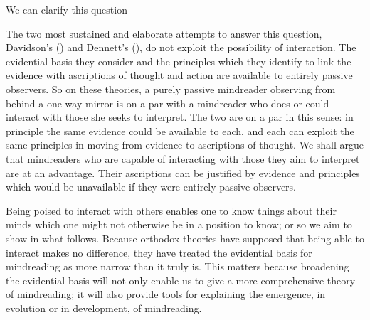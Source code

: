 \documentclass[12pt,a4paper]{extarticle}
\begin{document}
We can clarify this question



The two most sustained and elaborate attempts to answer this question,
Davidson's (\citeyear{Davidson:1984wh}) and Dennett's (\citeyear{Dennett:1987sf}),
do not exploit the possibility of interaction.
The evidential basis they consider and the principles which they identify to link the evidence with ascriptions of thought and action are available to entirely passive observers.
So on these theories,
a purely passive mindreader observing from behind a one-way mirror
is on a par with
a mindreader who does or could interact with those she seeks to interpret.
The two are on a par in this sense:
in principle the same evidence could be available to each, and each can exploit the same principles in moving from evidence to ascriptions of thought.
We shall argue that mindreaders who are capable of interacting with those they aim to interpret are at an advantage.
Their ascriptions can be justified by evidence and principles which would be unavailable if they were entirely passive observers.

Being poised to interact with others enables one to know things about their minds which one might not otherwise be in a position to know; or so we aim to show in what follows.
Because orthodox theories have supposed that being able to interact makes no difference,
they have treated the evidential basis for mindreading as more narrow than it truly is.
This matters because broadening the evidential basis will not only enable us to give a more comprehensive theory of mindreading; 
it will also provide tools for explaining the emergence, in evolution or in development, of mindreading.
\end{document}

